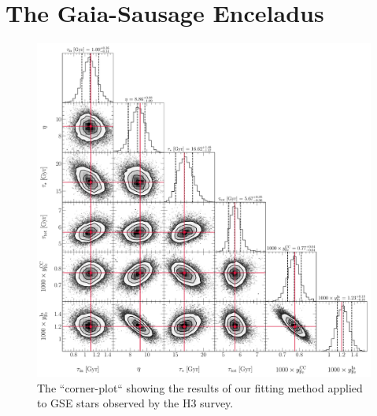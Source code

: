 \documentclass[ms.tex]{subfiles}
\begin{document}
\section{The Gaia-Sausage Enceladus}
\label{sec:gse}

\begin{figure}
\includegraphics[scale = 0.45]{gsechem_102k4.pdf}
\caption{The ``corner-plot`` showing the results of our fitting method
applied to GSE stars observed by the H3 survey.}
\label{fig:gse_corner}
\end{figure}
\end{document}
